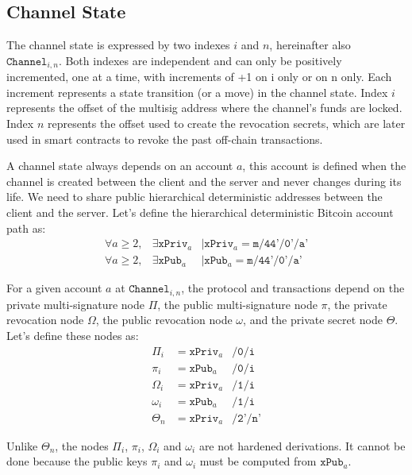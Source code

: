 \documentclass{llncs}
\begin{document}
\subsection{Channel State} The channel state is expressed by two indexes $i$ and
$n$, hereinafter also $\texttt{Channel}_{i,n}$. Both indexes are independent and
can only be positively incremented, one at a time, with increments of +1 on i
only or on n only. Each increment represents a state transition (or a move) in
the channel state. Index $i$ represents the offset of the multisig address where
the channel's funds are locked. Index $n$ represents the offset used to create
the revocation secrets, which are later used in smart contracts to revoke the
past off-chain transactions.

A channel state always depends on an account $a$, this account is defined when
the channel is created between the client and the server and never changes
during its life. We need to share public hierarchical deterministic addresses
between the client and the server. Let's define the hierarchical deterministic
Bitcoin account path as:
\begin{eqnarray*} \forall a \geq 2,& \exists \texttt{xPriv}_{a} &\mid
\texttt{xPriv}_{a} = \texttt{m/44'/0'/a'}\\ \forall a \geq 2,& \exists
\texttt{xPub}_{a} &\mid \texttt{xPub}_{a} = \texttt{m/44'/0'/a'}
\end{eqnarray*}

For a given account $a$ at $\texttt{Channel}_{i,n}$, the protocol and
transactions depend on the private multi-signature node $\Pi$, the public
multi-signature node $\pi$, the private revocation node $\Omega$, the public
revocation node $\omega$, and the private secret node $\Theta$. Let's define
these nodes as:
\begin{eqnarray*} \Pi_{i} &= \texttt{xPriv}_{a} &\texttt{/0/i}\\ \pi_{i} &=
\texttt{xPub}_{a} &\texttt{/0/i}\\ \Omega_{i} &= \texttt{xPriv}_{a}
&\texttt{/1/i}\\ \omega_{i} &= \texttt{xPub}_{a} &\texttt{/1/i}\\ \Theta_{n} &=
\texttt{xPriv}_{a} &\texttt{/2'/n'}
\end{eqnarray*}

Unlike $\Theta_{n}$, the nodes $\Pi_{i}$, $\pi_{i}$, $\Omega_{i}$ and
$\omega_{i}$ are not hardened derivations. It cannot be done because the public
keys $\pi_{i}$ and $\omega_{i}$ must be computed from $\texttt{xPub}_{a}$.
\end{document}
